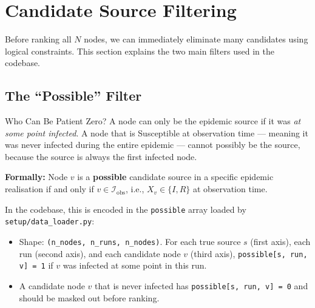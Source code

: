 \section{Candidate Source Filtering}
\label{sec:candidate-filtering}

Before ranking all $N$ nodes, we can immediately eliminate many candidates
using logical constraints. This section explains the two main filters used
in the codebase.

\subsection{The ``Possible'' Filter}

\begin{conceptbox}{Who Can Be Patient Zero?}
A node can only be the epidemic source if it was \emph{at some point
infected}. A node that is Susceptible at observation time — meaning it was
never infected during the entire epidemic — cannot possibly be the source,
because the source is always the first infected node.

\textbf{Formally:} Node $v$ is a \textbf{possible} candidate source in a
specific epidemic realisation if and only if $v \in \mathcal{I}_{\text{obs}}$,
i.e., $X_v \in \{I, R\}$ at observation time.
\end{conceptbox}

In the codebase, this is encoded in the \texttt{possible} array loaded by
\texttt{setup/data\_loader.py}:
\begin{itemize}
    \item Shape: \texttt{(n\_nodes, n\_runs, n\_nodes)}. For each true source
    $s$ (first axis), each run (second axis), and each candidate node $v$
    (third axis), \texttt{possible[s, run, v] = 1} if $v$ was infected at
    some point in this run.
    \item A candidate node $v$ that is never infected has
    \texttt{possible[s, run, v] = 0} and should be masked out before ranking.
\end{itemize}

